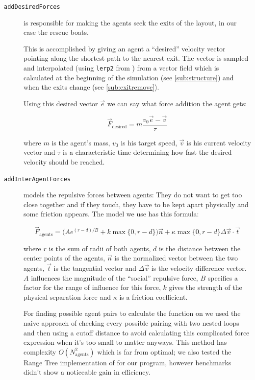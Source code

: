 \documentclass[11pt]{article}
\begin{document}
\begin{description}

\item[\texttt{addDesiredForces}] is responsible for making the agents seek the
exits of the layout, in our case the rescue boats.

This is accomplished by giving an agent a ``desired'' velocity vector pointing
along the shortest path to the nearest exit.  The vector is sampled and
interpolated (using \texttt{lerp2} from \cite{multilevel}) from a vector field
which is calculated at the beginning of the simulation (see
\ref{sub:structure}) and when the exits change (see \ref{sub:exitremove}).

Using this desired vector $\vec{e}$ we can say what force addition the agent gets:

\[ \vec{F}_\text{desired} = m \frac{v_0 \vec{e} - \vec{v}}{\tau} \]

where $m$ is the agent's mass, $v_0$ is his target speed, $\vec{v}$ is
his current velocity vector and $\tau$ is a characteristic time determining how
fast the desired velocity should be reached.

\item[\texttt{addInterAgentForces}] models the repulsive forces between agents:
They do not want to get too close together and if they touch, they have to be
kept apart physically and some friction appears.  The model we use has this
formula:

\[ \vec{F}_\text{agents} = \big(A e^{(r-d)/B} + k \max\{0, r-d\}\big) \vec{n} +
                     \kappa \max\{0, r-d\} \Delta \vec{v} \cdot \vec{t} \]

where $r$ is the sum of radii of both agents, $d$ is the distance between the
center points of the agents, $\vec{n}$ is the normalized vector between the two
agents, $\vec{t}$ is the tangential vector and $\Delta \vec{v}$ is the velocity
difference vector.  $A$ influences the magnitude of the ``social'' repulsive
force, $B$ specifies a factor for the range of influence for this force, $k$
gives the strength of the physical separation force and $\kappa$ is a friction
coefficient.

For finding possible agent pairs to calculate the function on we used the naive
approach of checking every possible pairing with two nested loops and then
using a cutoff distance to avoid calculating this complicated force expression
when it's too small to matter anyways.  This method has complexity
$O(N_\text{agents}^2)$ which is far from optimal; we also tested the Range Tree
implementation of \cite{multilevel} for our program, however benchmarks didn't
show a noticeable gain in efficiency.


\end{description}
\end{document}
